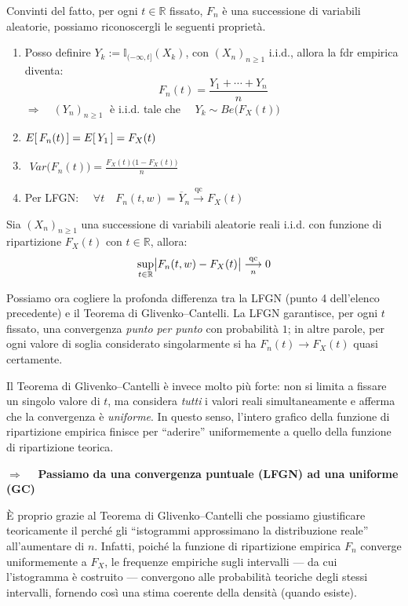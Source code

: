 Convinti del fatto, per ogni $t\in\mathbb R$ fissato, $F_n$ è una successione di variabili aleatorie, possiamo riconoscergli le seguenti proprietà.
\begin{enumerate}
    \item Posso definire $Y_k := \mathbb{I}_{(-\infty, t]}(X_k)$, con $(X_n)_{n\geq1}$ i.i.d., allora la fdr empirica diventa:
    \[F_n(t) = \frac{Y_1 + \cdots + Y_n}{n}\]
    $\Rightarrow\quad (Y_n)_{n\geq1}\;$ è i.i.d. tale che $\quad Y_k \sim Be\bigl(F_X(t)\bigr)$
    \item $E\!\left[\,F_n(t)\,\right] = E\!\left[\,Y_1\,\right] = F_X(t)$
    \item $\begin{aligned}Var\bigl(F_n(t)\bigr) = \frac{F_X(t)\bigl(1-F_X(t)\bigr)}{n}\end{aligned}$
    \item Per LFGN: $\quad \forall t\quad F_n(t, w) = \overline{Y}_n \overset{\text{qc}}{\longrightarrow}F_X(t)$
\end{enumerate}

\begin{teorema}
    Sia $(X_n)_{n\ge1}$ una successione di variabili aleatorie reali i.i.d. con
    funzione di ripartizione $F_X(t)$ con $t\in\mathbb{R}$, allora:
    \[\sup_{t\in\mathbb R}\bigl|F_n(t, w) - F_X(t)\bigr| \overunderset{\text{qc}}{n}{\longrightarrow} 0\]
\end{teorema}

Possiamo ora cogliere la profonda differenza tra la LFGN (punto 4 dell’elenco
precedente) e il Teorema di Glivenko--Cantelli. La LFGN garantisce, per ogni
$t$ fissato, una convergenza \emph{punto per punto} con probabilità $1$; in altre
parole, per ogni valore di soglia considerato singolarmente si ha $F_n(t)\to F_X(t)$
quasi certamente.

\medskip
\noindent 
Il Teorema di Glivenko--Cantelli è invece molto più forte: non si limita a fissare
un singolo valore di $t$, ma considera \emph{tutti} i valori reali simultaneamente e
afferma che la convergenza è \emph{uniforme}. In questo senso, l’intero grafico della funzione di ripartizione empirica finisce per “aderire” uniformemente a quello della funzione di ripartizione teorica.

\medskip
$\Rightarrow\quad $ \textbf{Passiamo da una convergenza puntuale (LFGN) ad una uniforme (GC)}

\bigskip
\noindent È proprio grazie al Teorema di Glivenko--Cantelli che possiamo giustificare teoricamente il perché gli ``istogrammi approssimano la distribuzione reale'' all'aumentare di $n$. Infatti, poiché la funzione di ripartizione empirica $F_n$ converge uniformemente a $F_X$, le frequenze empiriche sugli intervalli --- da cui l’istogramma è
costruito --- convergono alle probabilità teoriche degli stessi intervalli, fornendo
così una stima coerente della densità (quando esiste).


